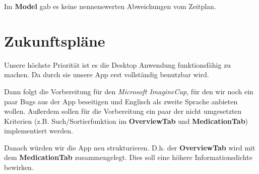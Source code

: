 \documentclass[a4paper]{scrreprt}
\begin{document}
Im \textbf{Model} gab es keine nennenswerten Abweichungen vom Zeitplan.
\section{Zukunftspläne}
Unsere höchste Priorität ist es die Desktop Anwendung funktionsfähig zu machen. Da durch sie unsere App erst vollständig benutzbar wird.

Dann folgt die Vorbereitung für den \textit{Microsoft ImagineCup}, für den wir noch ein paar Bugs aus der App beseitigen und Englisch als zweite Sprache anbieten wollen. Außerdem sollen für die Vorbereitung ein paar der nicht umgesetzten Kriterien (z.B. Such/Sortierfunktion im \textbf{OverviewTab} und \textbf{MedicationTab}) implementiert werden.

Danach würden wir die App neu strukturieren. D.h. der \textbf{OverviewTab} wird mit dem \textbf{MedicationTab} zusammengelegt. Dies soll eine höhere Informationsdichte bewirken.

\glsaddall
\printnoidxglossaries

\listoffigures
 
\end{document}
